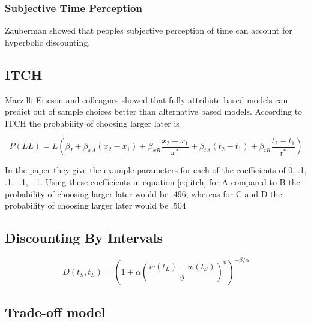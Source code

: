 \documentclass[]{article}
\begin{document}
\subsubsection{Subjective Time Perception}

Zauberman showed that peoples subjective perception of time can account for hyperbolic discounting. 

\subsection{ITCH}

Marzilli Ericson and colleagues showed that fully attribute based models can predict out of sample choices better than alternative based models. 
According to ITCH the probability of choosing larger later is

\begin{equation}\label{eq:itch}
	P(LL) = L \left(\beta_I + \beta_{xA}(x_2 - x_1) + \beta_{xR} \frac{x_2 - x_1}{x^*} + \beta_{tA}(t_2 - t_1) + \beta_{tR} \frac{t_2 - t_1}{t^*}\right)
\end{equation}

In the paper they give the example parameters for each of the coefficients of 0, .1, .1. -.1, -.1. Using these coefficients in equation \ref{eq:itch} for A compared to B the probability of choosing larger later would be $.496$, whereas for C and D the probability of choosing larger later would be $.504$


\subsection{Discounting By Intervals}

\begin{equation}\label{eq:int}
	D(t_S, t_L) = \left(1 + \alpha \left(\frac{w(t_L) - w(t_S)}{\vartheta}\right)^{\vartheta}\right)^{-\beta/\alpha}
\end{equation}


\subsection{Trade-off model}

\end{document}

